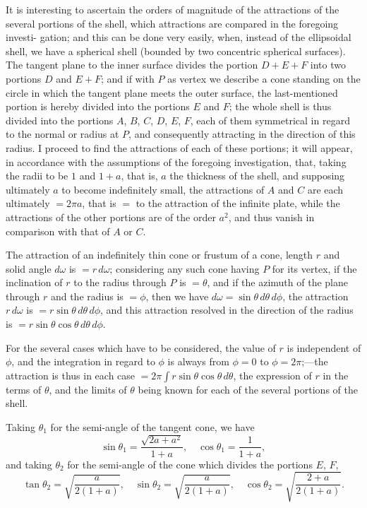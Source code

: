 \documentclass[11pt,a4paper]{article}
\theoremstyle{definition}
\begin{document}
It is interesting to ascertain the orders of magnitude of the attractions of the
several portions of the shell, which attractions are compared in the foregoing investi-
gation; and this can be done very easily, when, instead of the ellipsoidal shell, we
have a spherical shell (bounded by two concentric spherical surfaces). The tangent plane
to the inner surface divides the portion $D+E+F$ into two portions $D$ and $E+F$;
and if with $P$ as vertex we describe a cone standing on the circle in which the
tangent plane meets the outer surface, the last-mentioned portion is hereby divided into
the portions $E$ and $F$; the whole shell is thus divided into the portions $A$, $B$, $C$, $D$, $E$, $F$,
each of them symmetrical in regard to the normal or radius at $P$, and consequently
attracting in the direction of this radius. I proceed to find the attractions of each
of these portions; it will appear, in accordance with the assumptions of the foregoing
investigation, that, taking the radii to be $1$ and $1+a$, that is, $a$ the thickness of the
shell, and supposing ultimately $a$ to become indefinitely small, the attractions of $A$
and $C$ are each ultimately $=2\pi a$, that is $=$ to the attraction of the infinite plate,
while the attractions of the other portions are of the order $a^2$, and thus vanish in
comparison with that of $A$ or $C$.

The attraction of an indefinitely thin cone or frustum of a cone, length $r$ and
solid angle $d\omega$ is $=r\,d\omega$; considering any such cone having $P$ for its vertex, if the
inclination of $r$ to the radius through $P$ is $=\theta$, and if the azimuth of the plane
through $r$ and the radius is $=\phi$, then we have $d\omega=\sin\theta\,d\theta\,d\phi$, the attraction $r\,d\omega$ is
$=r\sin\theta\,d\theta\,d\phi$, and this attraction resolved in the direction of the radius is
$=r\sin\theta\cos\theta\,d\theta\,d\phi$.

For the several cases which have to be considered, the value of $r$ is independent of
$\phi$, and the integration in regard to $\phi$ is always from $\phi=0$ to $\phi=2\pi$;---the attraction
is thus in each case $=2\pi\!\int r\sin\theta\cos\theta\,d\theta$, the expression of $r$ in the terms of $\theta$, and
the limits of $\theta$ being known for each of the several portions of the shell.

Taking $\theta_1$ for the semi-angle of the tangent cone, we have
\[
\sin\theta_1 = \frac{\sqrt{2a+a^2}}{1+a}, \quad
\cos\theta_1 = \frac{1}{1+a},
\]
and taking $\theta_2$ for the semi-angle of the cone which divides the portions $E$, $F$,
\[
\tan\theta_2 = \sqrt{\frac{a}{2(1+a)}}, \quad
\sin\theta_2 = \sqrt{\frac{a}{2(1+a)}}, \quad
\cos\theta_2 = \sqrt{\frac{2+a}{2(1+a)}}.
\]
\end{document}
